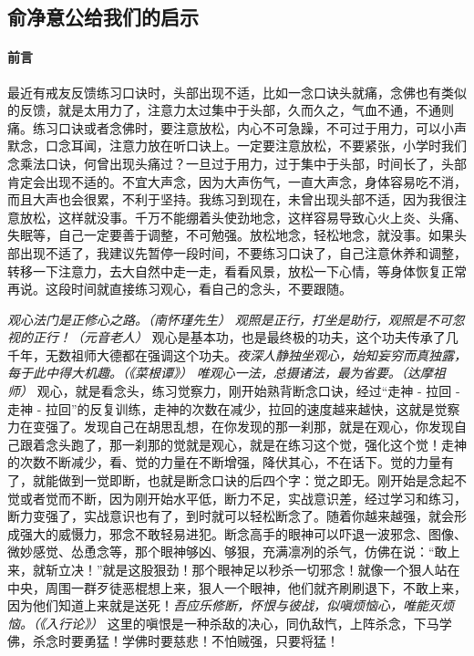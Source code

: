 \subsection{俞净意公给我们的启示}

\paragraph*{前言}

最近有戒友反馈练习口诀时，头部出现不适，比如一念口诀头就痛，念佛也有类似的反馈，就是太用力了，注意力太过集中于头部，久而久之，气血不通，不通则痛。练习口诀或者念佛时，要注意放松，内心不可急躁，不可过于用力，可以小声默念，口念耳闻，注意力放在听口诀上。一定要注意放松，不要紧张，小学时我们念乘法口诀，何曾出现头痛过？一旦过于用力，过于集中于头部，时间长了，头部肯定会出现不适的。不宜大声念，因为大声伤气，一直大声念，身体容易吃不消，而且大声也会很累，不利于坚持。我练习到现在，未曾出现头部不适，因为我很注意放松，这样就没事。千万不能绷着头使劲地念，这样容易导致心火上炎、头痛、失眠等，自己一定要善于调整，不可勉强。放松地念，轻松地念，就没事。如果头部出现不适了，我建议先暂停一段时间，不要练习口诀了，自己注意休养和调整，转移一下注意力，去大自然中走一走，看看风景，放松一下心情，等身体恢复正常再说。这段时间就直接练习观心，看自己的念头，不要跟随。

\textit{观心法门是正修心之路。（南怀瑾先生）} \textit{观照是正行，打坐是助行，观照是不可忽视的正行！（元音老人）} 观心是基本功，也是最终极的功夫，这个功夫传承了几千年，无数祖师大德都在强调这个功夫。\textit{夜深人静独坐观心，始知妄穷而真独露，每于此中得大机趣。（《菜根谭》）} \textit{唯观心一法，总摄诸法，最为省要。（达摩祖师）} 观心，就是看念头，练习觉察力，刚开始熟背断念口诀，经过“走神 - 拉回 - 走神 - 拉回”的反复训练，走神的次数在减少，拉回的速度越来越快，这就是觉察力在变强了。发现自己在胡思乱想，在你发现的那一刹那，就是在观心，你发现自己跟着念头跑了，那一刹那的觉就是观心，就是在练习这个觉，强化这个觉！走神的次数不断减少，看、觉的力量在不断增强，降伏其心，不在话下。觉的力量有了，就能做到一觉即断，也就是断念口诀的后四个字：觉之即无。刚开始是念起不觉或者觉而不断，因为刚开始水平低，断力不足，实战意识差，经过学习和练习，断力变强了，实战意识也有了，到时就可以轻松断念了。随着你越来越强，就会形成强大的威慑力，邪念不敢轻易进犯。断念高手的眼神可以吓退一波邪念、图像、微妙感觉、怂恿念等，那个眼神够凶、够狠，充满凛冽的杀气，仿佛在说：“敢上来，就斩立决！”就是这股狠劲！那个眼神足以秒杀一切邪念！就像一个狠人站在中央，周围一群歹徒恶棍想上来，狠人一个眼神，他们就齐刷刷退下，不敢上来，因为他们知道上来就是送死！\textit{吾应乐修断，怀恨与彼战，似嗔烦恼心，唯能灭烦恼。（《入行论》）} 这里的嗔恨是一种杀敌的决心，同仇敌忾，上阵杀念，下马学佛，杀念时要勇猛！学佛时要慈悲！不怕贼强，只要将猛！

